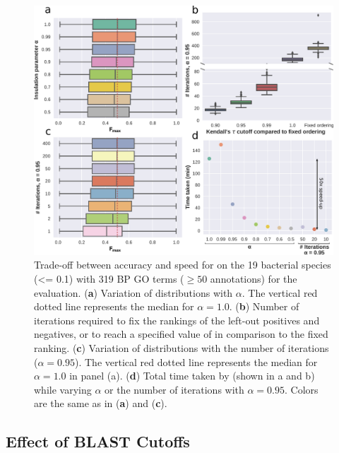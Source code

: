 \begin{figure}[H]
    \centering
    \includegraphics[width=\textwidth]{figs/fig1-2018_06-seq-sim-e0_1-string-expc-rem-neg-comp-iea-50-1000-bp-a0_95.pdf}
    \caption{Trade-off between accuracy and speed for \sinksource on the 19 bacterial species \SSN (\eval <= 0.1) with 319 BP GO terms ($\ge 50$ annotations) for the \loso evaluation. 
      (\textbf{a}) Variation of \fmax distributions with $\alpha$. The vertical red dotted line represents the median \fmax for $\alpha = 1.0$.
      (\textbf{b}) Number of iterations required to fix the rankings of the left-out positives and negatives, or to reach a specified value of \ktau in comparison to the fixed ranking.
      (\textbf{c}) Variation of \fmax distributions with the number of iterations ($\alpha=0.95$). The vertical red dotted line represents the median \fmax for $\alpha = 1.0$ in panel (a).
      (\textbf{d}) Total time taken by \sinksource (shown in a and b) while varying $\alpha$ or the number of iterations with $\alpha=0.95$. Colors are the same as in (\textbf{a}) and (\textbf{c}).
    }
    \label{fig:sinksource-speed-vs-accuracy}
\end{figure}

\subsection{Effect of BLAST \eval Cutoffs}
\label{sec:effect-eval-cutoffs}


